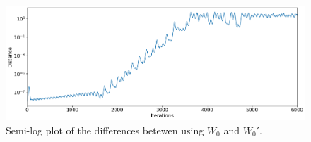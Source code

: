 \documentclass{article}
\begin{document}
\begin{figure}[H]
\begin{center}
    \includegraphics[width=\textwidth]{figures/diff.png}
\end{center}
\vspace{-2em}
    \caption{Semi-log plot of the differences betewen using $W_0$ and $W_0'$.}
    \label{fig:4}
\end{figure}
\end{document}

